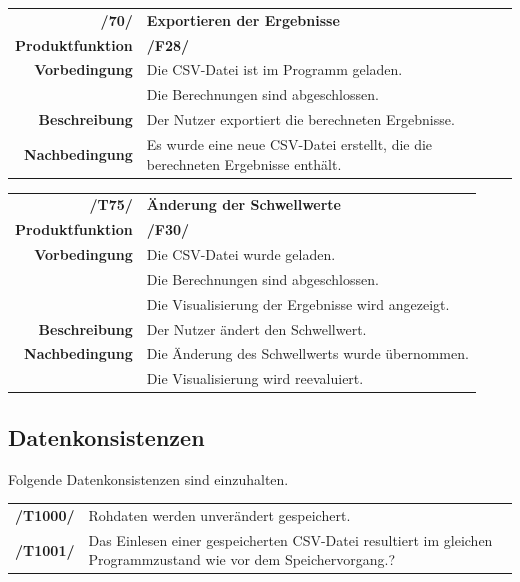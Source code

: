 \documentclass{article}
\begin{document}
\begin{table}[H]
\begin{tabularx}{\textwidth}{rX} \vspace{1mm}
\textbf{/70/}         & \textbf{Exportieren der Ergebnisse}  \\ \vspace{1mm}
\textbf{Produktfunktion} & \textbf{/F28/} \\
\textbf{Vorbedingung}  & Die CSV-Datei ist im Programm geladen. \\ \vspace{1mm} & Die Berechnungen sind abgeschlossen.   \\ \vspace{1mm}
\textbf{Beschreibung}  & Der Nutzer exportiert die berechneten Ergebnisse. \\
\textbf{Nachbedingung} & Es wurde eine neue CSV-Datei erstellt, die die berechneten Ergebnisse enthält.
\end{tabularx}
\end{table}

\begin{table}[H]
\begin{tabularx}{\textwidth}{rX} \vspace{1mm}
\textbf{/T75/}         & \textbf{Änderung der Schwellwerte} \\ \vspace{1mm}
\textbf{Produktfunktion} & \textbf{/F30/} \\
\textbf{Vorbedingung}  & Die CSV-Datei wurde geladen. \\ & Die Berechnungen sind abgeschlossen. \\ \vspace{1mm} & Die Visualisierung der Ergebnisse wird angezeigt.\\ \vspace{1mm}
\textbf{Beschreibung}  & Der Nutzer ändert den Schwellwert. \\
\textbf{Nachbedingung} & Die Änderung des Schwellwerts wurde übernommen. \\ & Die Visualisierung wird reevaluiert.
\end{tabularx}
\end{table}


\subsection{Datenkonsistenzen}
Folgende Datenkonsistenzen sind einzuhalten.
\begin{table}[H]
\begin{tabularx}{\textwidth}{rX}
\textbf{/T1000/}        & Rohdaten werden unverändert gespeichert. \\              \textbf{/T1001/}        & Das Einlesen einer gespeicherten CSV-Datei resultiert im gleichen Programmzustand wie vor dem Speichervorgang.? \\
\end{tabularx}
\end{table}
\end{document}
